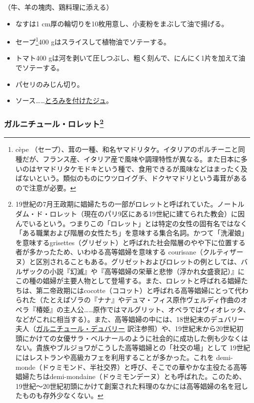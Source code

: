 \begin{recette}
（牛、羊の塊肉、鶏料理に添える）

\begin{itemize}
\item
  なすは1 cm厚の輪切りを10枚用意し、小麦粉をまぶして油で揚げる。
\item
  セープ\footnote{cèpe
    （セープ）、茸の一種、和名ヤマドリタケ。イタリアのポルチーニと同種だが、フランス産、イタリア産で風味や調理特性が異なる。また日本に多いのはヤマドリタケモドキという種で、食用できるが風味などはまったく及ばないという。類似のものにウツロイグチ、ドクヤマドリという毒茸があるので注意が必要。}400
  gはスライスして植物油でソテーする。
\item
  トマト400
  gは河を剥いて圧しつぶし、粗く刻んで、にんにく1片を加えて油でソテーする。
\item
  パセリのみじん切り。
\item
  ソース\ldots{}\ldots{}\protect\hyperlink{jus-de-veau-lie}{とろみを付けたジュ}。
\end{itemize}

\hypertarget{garniture-lorette}{%
\subsubsection[ガルニチュール・ロレット]{\texorpdfstring{ガルニチュール・ロレット\footnote{19世紀の7月王政期に娼婦たちの一部がロレットと呼ばれていた。ノートルダム・ド・ロレット（現在のパリ9区にある19世紀に建てられた教会）に因んでいるという。つまりこの「ロレット」とは特定の女性の固有名ではなく「ある職業および階層の女性たち」を意味する集合名詞。かつて「洗濯娘」を意味するgrisettes（グリゼット）と呼ばれた社会階層のやや下に位置する者が多かったため、いわゆる高等娼婦を意味する
  courisane（クルティザーヌ）と区別されることもある。グリゼットおよびロレットの例としては、バルザックの小説『幻滅』や『高等娼婦の栄華と悲惨（浮かれ女盛衰記）』にこの種の娼婦が主要人物として登場する。また、ロレットと呼ばれる娼婦たちは、第二帝政期にはcocotte（ココット）と呼ばれる高等娼婦にとって代わられた（たとえばゾラの『ナナ』やデュマ・フィス原作ヴェルディ作曲のオペラ『椿姫』の主人公\ldots{}\ldots{}原作ではマルグリット、オペラではヴィオレッタ、などがこれに相当する）。また、高等娼婦の中には、18世紀末のデュバリー夫人（\protect\hyperlink{garuniture-dubarry}{ガルニチュール・デュバリー}
  訳注参照）や、19世紀末から20世紀初頭にかけての女優サラ・ベルナールのように社会的に成功した例も少なくはない。貴族やブルジョワがこうした高等娼婦との「社交の場」として
  19世紀にはレストランや高級カフェを利用することが多かった。これを
  demi-monde（ドゥミモンド、半社交界）と呼び、そこでの華やかな主役たる高等娼婦たちはdemi-mondaine（ドゥミモンデーヌ）とも呼ばれた。このため、19世紀〜20世紀初頭にかけて創案された料理のなかには高等娼婦の名を冠したものも存外少なくない。}}{ガルニチュール・ロレット}}\label{garniture-lorette}}


\end{recette}
